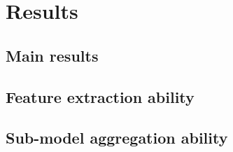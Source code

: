 
\chapter{Results}
\label{chap:result}

\section{Main results}


\section{Feature extraction ability}


\section{Sub-model aggregation ability}

